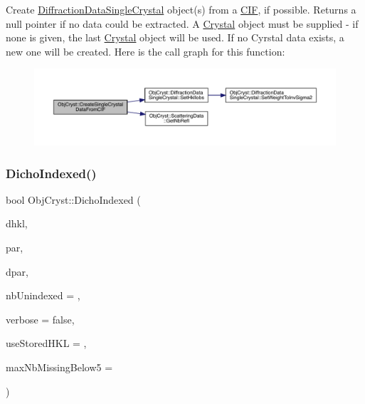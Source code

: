 Create \mbox{\hyperlink{class_obj_cryst_1_1_diffraction_data_single_crystal}{Diffraction\+Data\+Single\+Crystal}} object(s) from a \mbox{\hyperlink{class_obj_cryst_1_1_c_i_f}{C\+IF}}, if possible. Returns a null pointer if no data could be extracted. A \mbox{\hyperlink{class_obj_cryst_1_1_crystal}{Crystal}} object must be supplied -\/ if none is given, the last \mbox{\hyperlink{class_obj_cryst_1_1_crystal}{Crystal}} object will be used. If no Cyrstal data exists, a new one will be created. Here is the call graph for this function\+:
\nopagebreak
\begin{figure}[H]
\begin{center}
\leavevmode
\includegraphics[width=350pt]{namespace_obj_cryst_a336ceab5acf3427d69f799599e47a976_cgraph}
\end{center}
\end{figure}
\mbox{\label{namespace_obj_cryst_a1663a65913645de7313e28d464e28bd0}} 
\subsubsection{\texorpdfstring{DichoIndexed()}{DichoIndexed()}}
{\footnotesize\ttfamily bool Obj\+Cryst\+::\+Dicho\+Indexed (\begin{DoxyParamCaption}\item[{const \mbox{\hyperlink{class_obj_cryst_1_1_peak_list}{Peak\+List}} \&}]{dhkl,  }\item[{const \mbox{\hyperlink{class_obj_cryst_1_1_rec_unit_cell}{Rec\+Unit\+Cell}} \&}]{par,  }\item[{const \mbox{\hyperlink{class_obj_cryst_1_1_rec_unit_cell}{Rec\+Unit\+Cell}} \&}]{dpar,  }\item[{const unsigned int}]{nb\+Unindexed = {},  }\item[{const bool}]{verbose = {\ttfamily false},  }\item[{unsigned int}]{use\+Stored\+H\+KL = {},  }\item[{const unsigned int}]{max\+Nb\+Missing\+Below5 = {} }\end{DoxyParamCaption})}

